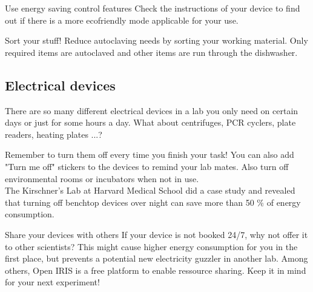 \begin{suggest}{Use energy saving control features }
	Check the instructions of your device to find out if there is a more ecofriendly mode applicable for your use.
	
\end{suggest}	

\begin{suggest}{Sort your stuff! }
	Reduce autoclaving needs by sorting your working material. Only required items are autoclaved and other items are run through the dishwasher.
\end{suggest}	


\subsection{Electrical devices}
	There are so many different electrical devices in a lab you only need on certain days or just for some hours a day. 
	What about centrifuges, PCR cyclers, plate readers, heating plates ...? 
	
	
\begin{suggest}{Remember to turn them off every time you finish your task!} 
	You can also add "Turn me off" stickers to the devices to remind your lab mates. 
	Also turn off environmental rooms or incubators when not in use.\\ 
	The Kirschner's Lab at Harvard Medical School did a case study and revealed that turning off benchtop devices over night can save more than 50 \% of energy consumption. \cite{Kirschner_1} \cite{Kirschner_2}
\end{suggest}	

\begin{suggest}{Share your devices with others}
	If your device is not booked 24/7, why not offer it to other scientists? This might cause higher energy consumption for you in the first place, but prevents a potential new electricity guzzler in another lab. Among others, Open IRIS is a free platform to enable ressource sharing. Keep it in mind for your next experiment! \cite{IRIS}
\end{suggest}

